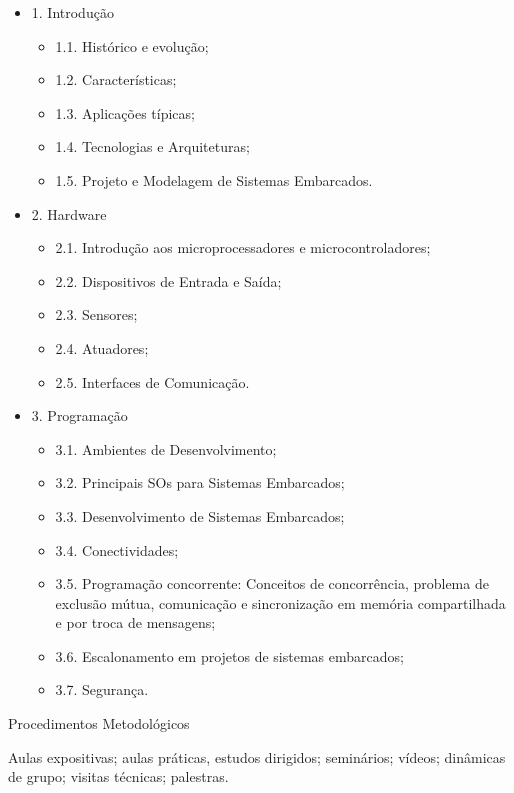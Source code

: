 \documentclass{article}
\begin{document}
\begin{itemize}
      \item 1. Introdução
      \begin{itemize}
           \item 1.1. Histórico e evolução;
           \item 1.2. Características;
           \item 1.3. Aplicações típicas;
           \item 1.4. Tecnologias e Arquiteturas;
           \item 1.5. Projeto e Modelagem de Sistemas Embarcados.
      \end{itemize}
      \item 2. Hardware
      \begin{itemize}
            \item 2.1. Introdução aos microprocessadores e microcontroladores;
            \item 2.2. Dispositivos de Entrada e Saída;
            \item 2.3. Sensores;
            \item 2.4. Atuadores;
            \item 2.5. Interfaces de Comunicação.
      \end{itemize}
      \item 3. Programação
      \begin{itemize}
            \item 3.1. Ambientes de Desenvolvimento;
            \item 3.2. Principais SOs para Sistemas Embarcados;
            \item 3.3. Desenvolvimento de Sistemas Embarcados;
            \item 3.4. Conectividades;
            \item 3.5. Programação concorrente: Conceitos de concorrência, problema de exclusão mútua, comunicação e sincronização em memória compartilhada e por troca de mensagens;
            \item 3.6. Escalonamento em projetos de sistemas embarcados;
            \item 3.7. Segurança.
      \end{itemize}
\end{itemize}

\begin{center}
Procedimentos Metodológicos
\end{center}
Aulas expositivas; aulas práticas, estudos dirigidos; seminários; vídeos; dinâmicas de grupo; visitas
técnicas; palestras.
\end{document}
